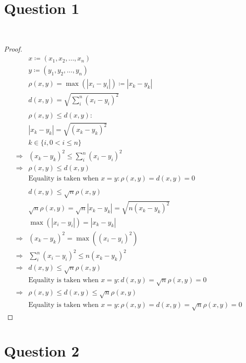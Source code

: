 \documentclass{article}
\begin{document}
\section*{Question 1}

~

\begin{proof}
    \begin{align*}
        &x\coloneqq(x_1,x_2,...,x_n)\\
        &y\coloneqq(y_1,y_2,...,y_n)\\
        &\rho(x,y)=\max(|x_i-y_i|)\coloneqq |x_k-y_k|\\
        &d(x,y)=\sqrt{\sum_{i}^{n}(x_i-y_i)^2}\\
        &\\
        &\rho (x,y)\leqslant d(x,y):\\
        &|x_k-y_k|=\sqrt{(x_k-y_k)^2}\\
        &k\in\{i,0<i\leqslant n\}\\
        \Rightarrow&(x_k-y_k)^2\leqslant \sum_{i}^{n}(x_i-y_i)^2\\
        \Rightarrow&\rho(x,y)\leqslant d(x,y)\\
        &\text{Equality is taken when }x=y:\rho(x,y)=d(x,y)=0\\
        &\\
        &d(x,y)\leqslant\sqrt{n}\rho(x,y)\\
        &\sqrt{n}\rho(x,y)=\sqrt{n}|x_k-y_k|=\sqrt{n(x_k-y_k)^2}\\
        &\max(|x_i-y_i|)=|x_k-y_k|\\
        \Rightarrow&(x_k-y_k)^2=\max((x_i-y_i)^2)\\
        \Rightarrow&\sum_{i}^{n}(x_i-y_i)^2\leqslant n(x_k-y_k)^2\\
        \Rightarrow&d(x,y)\leqslant\sqrt{n}\rho(x,y)\\
        &\text{Equality is taken when }x=y:d(x,y)=\sqrt{n}\rho(x,y)=0\\
        \Rightarrow&\rho (x,y)\leqslant d(x,y)\leqslant\sqrt{n}\rho(x,y)\\
        &\text{Equality is taken when }x=y:\rho(x,y)=d(x,y)=\sqrt{n}\rho(x,y)=0
    \end{align*}
\end{proof}

\newpage

\section*{Question 2}
\end{document}
